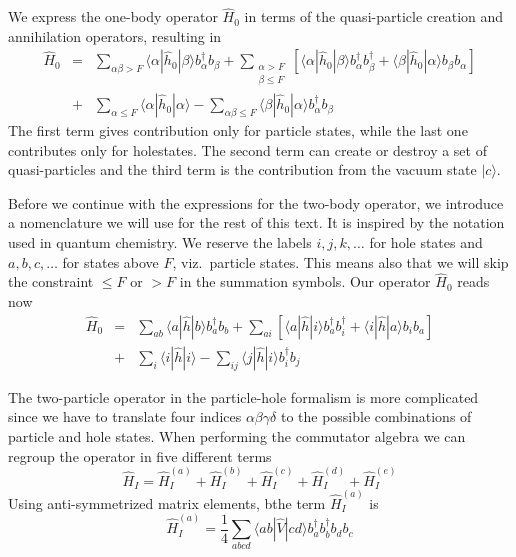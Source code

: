 \documentclass[graybox,sectrefs,envcountresetchap,open=right]{svmonodo}
\begin{document}
We express the one-body operator $\hat{H}_0$ in terms of the quasi-particle creation and annihilation operators, resulting in
\begin{eqnarray}
	\hat{H}_0 &=& \sum_{\alpha\beta > F} \langle \alpha|\hat{h}_0|\beta\rangle  b_\alpha^\dagger b_\beta +
		\sum_{\begin{array}{c} \alpha > F \\ \beta \leq F \end{array}} \left[
		\langle \alpha|\hat{h}_0|\beta\rangle b_\alpha^\dagger b_\beta^\dagger + 
		\langle \beta|\hat{h}_0|\alpha\rangle b_\beta  b_\alpha \right] \nonumber \\
	&+& \sum_{\alpha \leq F} \langle \alpha|\hat{h}_0|\alpha\rangle - 
		\sum_{\alpha\beta \leq F} \langle \beta|\hat{h}_0|\alpha\rangle
		b_\alpha^\dagger b_\beta \label{eq:2-63b}
\end{eqnarray}
The first term  gives contribution only for particle states, while the last one
contributes only for holestates. The second term can create or destroy a set of
quasi-particles and 
the third term is the contribution  from the vacuum state $|c\rangle$.





Before we continue with the expressions for the two-body operator, we introduce a nomenclature we will use for the rest of this
text. It is inspired by the notation used in quantum chemistry.
We reserve the labels $i,j,k,\dots$ for hole states and $a,b,c,\dots$ for states above $F$, viz.~particle states.
This means also that we will skip the constraint $\leq F$ or $> F$ in the summation symbols. 
Our operator $\hat{H}_0$  reads now 
\begin{eqnarray}
	\hat{H}_0 &=& \sum_{ab} \langle a|\hat{h}|b\rangle b_a^\dagger b_b +
		\sum_{ai} \left[
		\langle a|\hat{h}|i\rangle b_a^\dagger b_i^\dagger + 
		\langle i|\hat{h}|a\rangle b_i  b_a \right] \nonumber \\
	&+& \sum_{i} \langle i|\hat{h}|i\rangle - 
		\sum_{ij} \langle j|\hat{h}|i\rangle
		b_i^\dagger b_j \label{eq:2-63b}
\end{eqnarray} 




The two-particle operator in the particle-hole formalism  is more complicated since we have
to translate four indices $\alpha\beta\gamma\delta$ to the possible combinations of particle and hole
states.  When performing the commutator algebra we can regroup the operator in five different terms
\begin{equation}
	\hat{H}_I = \hat{H}_I^{(a)} + \hat{H}_I^{(b)} + \hat{H}_I^{(c)} + \hat{H}_I^{(d)} + \hat{H}_I^{(e)} \label{eq:2-65}
\end{equation}
Using anti-symmetrized  matrix elements, 
bthe term  $\hat{H}_I^{(a)}$ is  
\begin{equation}
	\hat{H}_I^{(a)} = \frac{1}{4}
	\sum_{abcd} \langle ab|\hat{V}|cd\rangle 
		b_a^\dagger b_b^\dagger b_d b_c \label{eq:2-66}
\end{equation}
\end{document}
